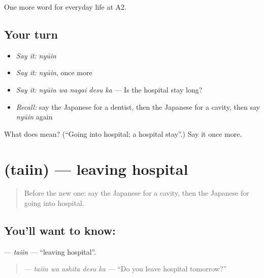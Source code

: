 \begin{grammarlens}[title={What you've built}]
One more word for everyday life at A2.
\end{grammarlens}

\subsection*{Your turn}
\begin{itemize}
\raggedright
  \item \emph{Say it:} \emph{nyūin}
  \item \emph{Say it:} \emph{nyūin}, once more
  \item \emph{Say it:} \emph{nyūin wa nagai desu ka} — Is the hospital stay long?
  \item \emph{Recall:} say the Japanese for a dentist, then the Japanese for a cavity, then say \emph{nyūin} again
\end{itemize}

\begin{tcolorbox}[breakable,colback=teal!4,colframe=teal!35!black,title={Before you move on}]
What does  mean? (\textquotedblleft{}Going into hospital; a hospital stay\textquotedblright{}.) Say it once more.
\end{tcolorbox}
\section[\texorpdfstring{\ja{たいいん} (taiin)}{たいいん (taiin)}]{ (taiin) — leaving hospital}

\label{lesson:JA-C218-taiin}



\begin{quote}
Before the new one: say the Japanese for a cavity, then the Japanese for going into hospital.
\end{quote}

\subsection*{You'll want to know: }
\textbf{} — \emph{taiin} — \textquotedblleft{}leaving hospital\textquotedblright{}.

\begin{quote}
\textbf{ } — \emph{taiin wa ashita desu ka} — \textquotedblleft{}Do you leave hospital tomorrow?\textquotedblright{}
\end{quote}

